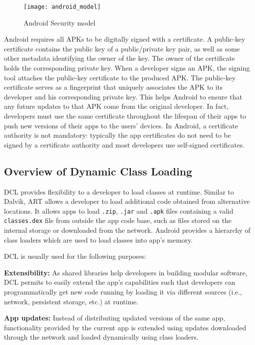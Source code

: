 \begin{figure}[H]
\centering
\texttt{[image: android\_model]}
\caption{Android Security model}
\label{fig:androidmodel}
\end{figure}

Android requires  all APKs to be digitally signed with a certificate. A public-key certificate contains the public key of a public/private key pair, as well as some other metadata identifying the owner of the key. The owner of the certificate holds the corresponding private key. When a developer signs an APK, the signing tool attaches the public-key certificate to the produced APK. The public-key certificate serves as a fingerprint that uniquely associates the APK to its developer and his corresponding private key. This helps Android to ensure that any future updates to that APK  come from the original developer. In fact, developers must use the same certificate throughout the lifespan of their apps to push new versions of their apps to the users' devices. In Android, a certificate authority is not mandatory: typically the app certificates do not need to be signed by a certificate authority and most developers use self-signed certificates.


\subsection{Overview of Dynamic Class Loading} DCL provides flexibility to a developer to load classes at runtime. Similar to Dalvik, ART allows a developer to load additional code obtained from alternative locations. It allows apps to load \texttt{.zip}, \texttt{.jar} and \texttt{.apk} files containing a valid \texttt{classes.dex} file from outside the app code base, such as files stored on the internal storage or downloaded from the network. Android provides a hierarchy of class loaders which are used to load classes into app's memory.

DCL is usually used for the following purposes: 

\textbf{Extensibility:} As shared libraries help developers in building modular software, DCL permits to easily extend the app's capabilities such that developers can programmatically get new code running by loading it via different sources (i.e., network, persistent storage, etc.) at runtime.

\textbf{App updates:} Instead of distributing updated versions of the same app, functionality provided by the current app is extended using updates downloaded through the network and loaded dynamically using class loaders.   

